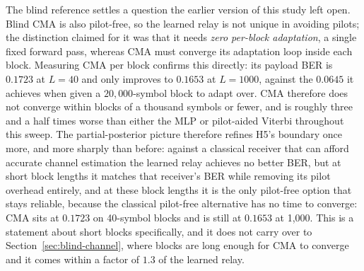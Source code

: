 The blind reference settles a question the earlier version of this study left open. Blind CMA is also pilot-free, so the learned relay is not unique in avoiding pilots; the distinction claimed for it was that it needs \emph{zero per-block adaptation}, a single fixed forward pass, whereas CMA must converge its adaptation loop inside each block. Measuring CMA per block confirms this directly: its payload BER is $0.1723$ at $L=40$ and only improves to $0.1653$ at $L=1000$, against the $0.0645$ it achieves when given a $20{,}000$-symbol block to adapt over. CMA therefore does not converge within blocks of a thousand symbols or fewer, and is roughly three and a half times worse than either the MLP or pilot-aided Viterbi throughout this sweep. The partial-posterior picture therefore refines H5's boundary once more, and more sharply than before: against a classical receiver that can afford accurate channel estimation the learned relay achieves no better BER, but at short block lengths it matches that receiver's BER while removing its pilot overhead entirely, and at these block lengths it is the only pilot-free option that stays reliable, because the classical pilot-free alternative has no time to converge: CMA sits at $0.1723$ on 40-symbol blocks and is still at $0.1653$ at 1{,}000. This is a statement about short blocks specifically, and it does not carry over to Section~\ref{sec:blind-channel}, where blocks are long enough for CMA to converge and it comes within a factor of $1.3$ of the learned relay.

